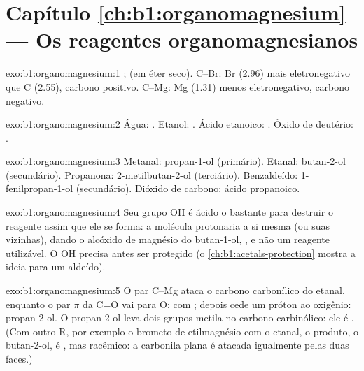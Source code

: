 \section*{Capítulo \ref{ch:b1:organomagnesium} --- Os reagentes organomagnesianos}

\begin{solution}{exo:b1:organomagnesium:1}
;  (em éter
seco). C--Br: Br (2.96) mais eletronegativo que C (2.55), carbono
positivo. C--Mg: Mg (1.31) menos eletronegativo, carbono negativo.
\end{solution}

\begin{solution}{exo:b1:organomagnesium:2}
Água: .
Etanol: .
Ácido etanoico: .
Óxido de deutério: .
\end{solution}

\begin{solution}{exo:b1:organomagnesium:3}
Metanal: propan-1-ol (primário). Etanal: butan-2-ol (secundário).
Propanona: 2-metilbutan-2-ol (terciário). Benzaldeído:
1-fenilpropan-1-ol (secundário). Dióxido de carbono: ácido propanoico.
\end{solution}

\begin{solution}{exo:b1:organomagnesium:4}
Seu grupo OH é ácido o bastante para destruir o reagente assim que ele
se forma: a molécula protonaria a si mesma (ou suas vizinhas), dando o
alcóxido de magnésio do butan-1-ol, , e não um
reagente utilizável. O OH precisa antes ser protegido
(o \cref{ch:b1:acetals-protection} mostra a ideia para um aldeído).
\end{solution}

\begin{solution}{exo:b1:organomagnesium:5}
O par C--Mg ataca o carbono carbonílico do etanal, enquanto o par $\pi$ da
C=O vai para O:  com ; depois  cede um
próton ao oxigênio: propan-2-ol. O propan-2-ol leva dois grupos metila
no carbono carbinólico: ele é . (Com outro R, por exemplo o
brometo de etilmagnésio com o etanal, o produto, o butan-2-ol, é ,
mas racêmico: a carbonila plana é atacada igualmente pelas duas faces.)
\end{solution}

